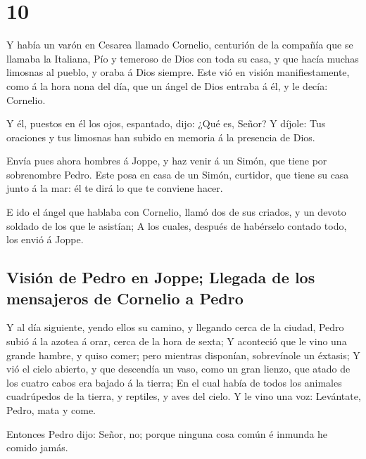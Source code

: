 \hypertarget{section-44-10}{%
\section{10}\label{section-44-10}}

 Y había un varón en Cesarea llamado Cornelio, centurión
de la compañía que se llamaba la Italiana,  Pío y temeroso
de Dios con toda su casa, y que hacía muchas limosnas al pueblo, y oraba
á Dios siempre.  Este vió en visión manifiestamente, como
á la hora nona del día, que un ángel de Dios entraba á él, y le decía:
Cornelio.

 Y él, puestos en él los ojos, espantado, dijo: ¿Qué es,
Señor? Y díjole: Tus oraciones y tus limosnas han subido en memoria á la
presencia de Dios.

 Envía pues ahora hombres á Joppe, y haz venir á un Simón,
que tiene por sobrenombre Pedro.  Este posa en casa de un
Simón, curtidor, que tiene su casa junto á la mar: él te dirá lo que te
conviene hacer.

 E ido el ángel que hablaba con Cornelio, llamó dos de sus
criados, y un devoto soldado de los que le asistían;  A
los cuales, después de habérselo contado todo, los envió á Joppe.

\hypertarget{visiuxf3n-de-pedro-en-joppe-llegada-de-los-mensajeros-de-cornelio-a-pedro}{%
\subsection{Visión de Pedro en Joppe; Llegada de los mensajeros de
Cornelio a
Pedro}\label{visiuxf3n-de-pedro-en-joppe-llegada-de-los-mensajeros-de-cornelio-a-pedro}}

 Y al día siguiente, yendo ellos su camino, y llegando
cerca de la ciudad, Pedro subió á la azotea á orar, cerca de la hora de
sexta;  Y aconteció que le vino una grande hambre, y
quiso comer; pero mientras disponían, sobrevínole un éxtasis;
 Y vió el cielo abierto, y que descendía un vaso, como un
gran lienzo, que atado de los cuatro cabos era bajado á la tierra;
 En el cual había de todos los animales cuadrúpedos de la
tierra, y reptiles, y aves del cielo.  Y le vino una voz:
Levántate, Pedro, mata y come.

 Entonces Pedro dijo: Señor, no; porque ninguna cosa
común é inmunda he comido jamás.

